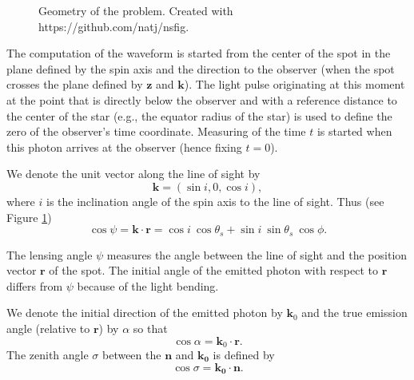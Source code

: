 \documentclass{wihuri}
\def\be{\begin{equation}}
\def\ee{\end{equation}}
\def\thetas{\theta_{s}}
\newcommand{\bmath}[1]{\boldsymbol{#1}}
\begin{document}
\begin{figure}
\centerline{}
\caption{Geometry of the problem. Created with https://github.com/natj/nsfig. %
\label{fig:geom2}}
\end{figure}



The computation of the waveform is started from the center of the spot in the plane defined by the spin axis and the direction to the observer 
(when the spot crosses the plane defined by $\bmath{z}$ and $\bmath{k}$). The light pulse originating at this moment at the point that is directly below the observer and with a reference distance to the center of the star (e.g., the equator radius of the star) is used to define the zero of the observer's time coordinate. Measuring of the time $t$ is started when this photon arrives at the observer (hence fixing $t=0$). %



We denote the unit vector along the line of sight by 
\be
\bmath{k}=(\sin i, 0, \cos i), 
\ee 
where $i$ is the inclination angle of the spin axis to the line of sight. 
Thus (see Figure \ref{fig:geom2})
\be \label{eq:psi2}
  \cos\psi=\bmath{k}\cdot \bmath{r} = \cos i\ \cos\thetas+\sin i\ \sin \thetas\ \cos\phi.
\ee

The lensing angle $\psi$ measures the angle between the line of sight and the position vector $\bmath{r}$ of the spot. The initial angle of the emitted photon with respect to
 ${\mathbf r}$ differs from $\psi$ because of the light bending.



We denote the initial direction of the emitted photon by $\bmath{k}_0$ %
and the true emission angle (relative to $\bmath{r}$) by $\alpha$ so that
\be
 \cos\alpha=\bmath{k}_0 \cdot \bmath{r}.
\ee
The zenith angle $\sigma$ between the $\bmath{n}$ and $\bmath{k_{0}}$ is defined by 
\be
\cos\sigma = \bmath{k_{0}}\cdot\bmath{n}.
\ee
\end{document}
